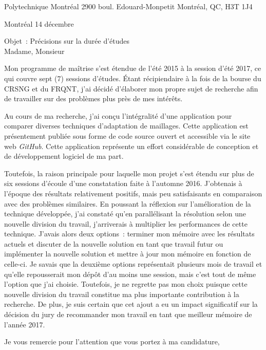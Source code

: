 \clurecipient
 {Polytechnique Montréal}
 {2900 boul. Edouard-Monpetit}
 {Montréal, QC, H3T 1J4}
 
\cllocationdate
 {Montréal}
 {14 décembre}
 
Objet~: Précisions sur la durée d'études\\
 
\clgreeting
 {Madame, Monsieur}

Mon programme de maîtrise s'est étendue de l'été 2015 à la session d'été 2017, ce qui couvre sept (7) sessions d'études. Étant récipiendaire à la fois de la bourse du CRSNG et du FRQNT, j'ai décidé d'élaborer mon propre sujet de recherche afin de travailler sur des problèmes plus près de mes intérêts.

Au cours de ma recherche, j'ai conçu l'intégralité d'une application pour comparer diverses techniques d'adaptation de maillages. Cette application est présentement publiée sous forme de code source ouvert et accessible via le site web \textit{GitHub}. Cette application représente un effort considérable de conception et de développement logiciel de ma part.

Toutefois, la raison principale pour laquelle mon projet s'est étendu sur plus de six sessions d'écoule d'une constatation faite à l'automne 2016. J'obtenais à l'époque des résultats relativement positifs, mais peu satisfaisants en comparaison avec des problèmes similaires. En poussant la réflexion sur l'amélioration de la technique développée, j'ai constaté qu'en parallélisant la résolution selon une nouvelle division du travail, j'arriverais à multiplier les performances de cette technique. J'avais alors deux options~: terminer mon mémoire avec les résultats actuels et discuter de la nouvelle solution en tant que travail futur ou implémenter la nouvelle solution et mettre à jour mon mémoire en fonction de celle-ci. Je savais que la deuxième options représentait plusieurs mois de travail et qu'elle repousserait mon dépôt d'au moins une session, mais c'est tout de même l'option que j'ai choisie. Toutefois, je ne regrette pas mon choix puisque cette nouvelle division du travail constitue ma plus importante contribution à la recherche. De plus, je suis certain que cet ajout a eu un impact significatif sur la décision du jury de recommander mon travail en tant que meilleur mémoire de l'année 2017.

Je vous remercie pour l'attention que vous portez à ma candidature,

